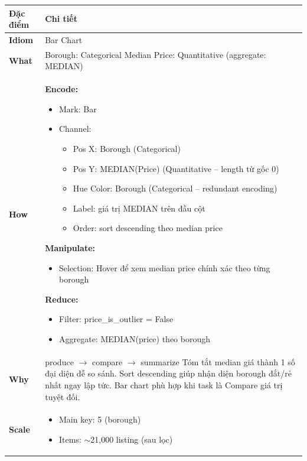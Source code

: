 \begin{longtable}{@{} p{2.8cm} p{12cm} @{}}
\toprule
\textbf{Đặc điểm} & \textbf{Chi tiết} \\
\midrule
\endhead

\bottomrule
\endfoot

\textbf{Idiom} & Bar Chart \\
\addlinespace[0.2cm]

\textbf{What} & Borough: Categorical \newline
Median Price: Quantitative (aggregate: MEDIAN) \\
\addlinespace[0.2cm]

\textbf{How} & \textbf{Encode:}
\begin{itemize}[nosep, leftmargin=*, topsep=0.1cm]
    \item Mark: Bar
    \item Channel:
    \begin{itemize}[nosep, leftmargin=0.5cm]
        \item Pos X: Borough (Categorical)
        \item Pos Y: MEDIAN(Price) (Quantitative -- length từ gốc 0)
        \item Hue Color: Borough (Categorical -- redundant encoding)
        \item Label: giá trị MEDIAN trên đầu cột
        \item Order: sort descending theo median price
    \end{itemize}
\end{itemize}

\vspace{0.2cm}
\textbf{Manipulate:}
\begin{itemize}[nosep, leftmargin=*, topsep=0.1cm]
    \item Selection: Hover để xem median price chính xác theo từng borough
\end{itemize}

\vspace{0.2cm}
\textbf{Reduce:}
\begin{itemize}[nosep, leftmargin=*, topsep=0.1cm]
    \item Filter: price\_is\_outlier = False
    \item Aggregate: MEDIAN(price) theo borough
\end{itemize} \\
\addlinespace[0.2cm]

\textbf{Why} & produce $\rightarrow$ compare $\rightarrow$ summarize \newline
Tóm tắt median giá thành 1 số đại diện dễ so sánh. Sort descending giúp nhận diện borough đắt/rẻ nhất ngay lập tức. Bar chart phù hợp khi task là Compare giá trị tuyệt đối. \\
\addlinespace[0.2cm]

\textbf{Scale} &
\begin{itemize}[nosep, leftmargin=*, topsep=0pt]
    \item Main key: 5 (borough)
    \item Items: $\sim$21,000 listing (sau lọc)
\end{itemize} \\
\end{longtable}

